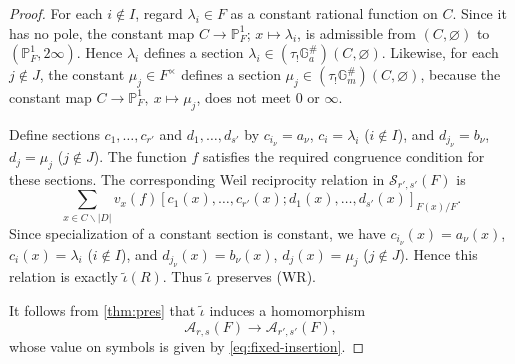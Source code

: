 \documentclass[a4paper,12pt,reqno]{amsart}
\numberwithin{equation}{section}
\theoremstyle{definition}
\newcommand{\bP}{\mathbb{P}}
\newcommand{\black}{\color{black}}
\newcommand{\Acal}{\mathcal{A}}
\newcommand{\GaSharp}{\mathbb{G}_{a}^{\#}}
\newcommand{\GmSharp}{\mathbb G_m^{\#}}
\begin{document}
\begin{proof}
For each $i\notin I$, regard $\lambda_i\in F$ as a constant rational
function on $C$.  Since it has no pole, the constant map
$C\to\bP^1_F$; $x\mapsto\lambda_i$,
is admissible from $(C,\varnothing)$ to
$(\bP^1_F,2\infty)$.
Hence $\lambda_i$ defines a section
$\lambda_i\in(\tau_!\GaSharp)(C,\varnothing)$.
Likewise, for each $j\notin J$, the constant
$\mu_j\in F^\times$ defines a section
$\mu_j\in(\tau_!\GmSharp)(C,\varnothing)$,
because the constant map
$C\to\bP^1_F,\ x\mapsto\mu_j$,
does not meet $0$ or $\infty$.

Define sections $c_1,\ldots,c_{r'}$ and
$d_1,\ldots,d_{s'}$ by
 $c_{i_\nu}=a_\nu$,  $c_i=\lambda_i$ ($i\notin I$),
and
 $d_{j_\nu}=b_\nu$, 
 $d_j=\mu_j$ ($j\notin J$).
The function $f$ satisfies the required congruence condition for these sections.
The corresponding Weil reciprocity relation in
$\mathcal S_{r',s'}(F)$ is
\[
 \sum_{x\in C\smallsetminus|D|}
 v_x(f)
 [c_1(x),\ldots,c_{r'}(x);
 d_1(x),\ldots,d_{s'}(x)]_{F(x)/F}.
\]
Since specialization of a constant section is constant, we have
 $c_{i_\nu}(x)=a_\nu(x)$, 
 $c_i(x)=\lambda_i$ ($i\notin I$),
and
 $d_{j_\nu}(x)=b_\nu(x)$, 
 $d_j(x)=\mu_j$ ($j\notin J$).
Hence this relation is exactly $\widetilde\iota(R)$.
Thus $\widetilde\iota$ preserves \textnormal{(WR)}.

It follows from \autoref{thm:pres} that
$\widetilde\iota$ induces a homomorphism
\[
 \Acal_{r,s}(F)\to\Acal_{r',s'}(F),
\]
whose value on symbols is given by \eqref{eq:fixed-insertion}.
\end{proof}
\black
\end{document}
